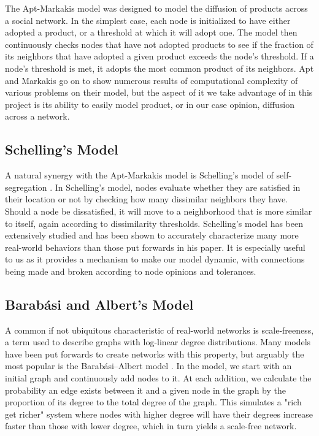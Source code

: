 \documentclass[12pt,twoside]{report}
\begin{document}
The Apt-Markakis model \cite{apt2011diffusion} was designed to model the diffusion of products across a social network. In the simplest case, each node is initialized to have either adopted a product, or a threshold at which it will adopt one. The model then continuously checks nodes that have not adopted products to see if the fraction of its neighbors that have adopted a given product exceeds the node's threshold. If a node's threshold is met, it adopts the most common product of its neighbors. Apt and Markakis go on to show numerous results of computational complexity of various problems on their model, but the aspect of it we take advantage of in this project is its ability to easily model product, or in our case opinion, diffusion across a network. \\

\subsection{Schelling's Model}

A natural synergy with the Apt-Markakis model is Schelling's model of self-segregation \cite{schelling1971dynamic}. In Schelling's model, nodes evaluate whether they are satisfied in their location or not by checking how many dissimilar neighbors they have. Should a node be dissatisfied, it will move to a neighborhood that is more similar to itself, again according to dissimilarity thresholds. Schelling's model has been extensively studied and has been shown to accurately characterize many more real-world behaviors than those put forwards in his paper. It is especially useful to us as it provides a mechanism to make our model dynamic, with connections being made and broken according to node opinions and tolerances. \\

\subsection{Barabási and Albert's Model}

A common if not ubiquitous characteristic of real-world networks is scale-freeness, a term used to describe graphs with log-linear degree distributions. Many models have been put forwards to create networks with this property, but arguably the most popular is the Barabási–Albert model \cite{barabasi1999emergence}. In the model, we start with an initial graph and continuously add nodes to it. At each addition, we calculate the probability an edge exists between it and a given node in the graph by the proportion of its degree to the total degree of the graph. This simulates a "rich get richer" system where nodes with higher degree will have their degrees increase faster than those with lower degree, which in turn yields a scale-free network. \\
\end{document}

